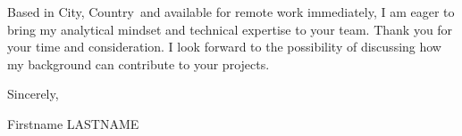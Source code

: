 \documentclass[11pt,a4paper]{article}
\providecommand{\cvname}{Firstname LASTNAME}
\providecommand{\cvlocation}{City, Country}
\begin{document}
Based in \cvlocation\ and available for remote work immediately, I am eager to bring my analytical mindset and technical expertise to your team. Thank you for your time and consideration. I look forward to the possibility of discussing how my background can contribute to your projects.

Sincerely,

\vspace{0.5cm}
\cvname
\end{document}
